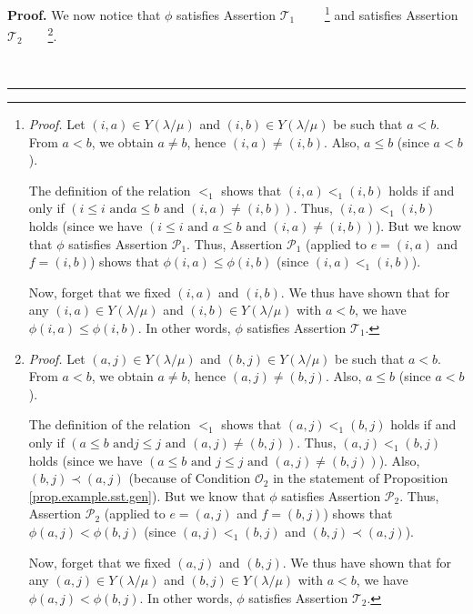 \documentclass[numbers=enddot,12pt,final,onecolumn,notitlepage,abstracton]{scrartcl}
\theoremstyle{definition}
\newenvironment{proof}[1][Proof]{\noindent\textbf{#1.} }{\ \rule{0.5em}{0.5em}}
\newenvironment{verlong}{}{}
\begin{document}
\begin{verlong}
\begin{footnotesize}
\begin{proof}
We now notice that $\phi$ satisfies Assertion $\mathcal{T}_{1}$%
\ \ \ \ \footnote{\textit{Proof.} Let $\left(  i,a\right)  \in Y\left(
\lambda/\mu\right)  $ and $\left(  i,b\right)  \in Y\left(  \lambda
/\mu\right)  $ be such that $a<b$. From $a<b$, we obtain $a\neq b$, hence
$\left(  i,a\right)  \neq\left(  i,b\right)  $. Also, $a \leq b$ (since $a <
b$).
\par
The definition of the relation $<_{1}$ shows that $\left(  i,a\right)
<_{1}\left(  i,b\right)  $ holds if and only if $\left(  i\leq i\text{ and
}a\leq b\text{ and }\left(  i,a\right)  \neq\left(  i,b\right)  \right)  $.
Thus, $\left(  i,a\right)  <_{1}\left(  i,b\right)  $ holds (since we have
$\left(  i\leq i\text{ and }a\leq b\text{ and }\left(  i,a\right)  \neq\left(
i,b\right)  \right)  $). But we know that $\phi$ satisfies Assertion
$\mathcal{P}_{1}$. Thus, Assertion $\mathcal{P}_{1}$ (applied to $e=\left(
i,a\right)  $ and $f=\left(  i,b\right)  $) shows that $\phi\left(
i,a\right)  \leq\phi\left(  i,b\right)  $ (since $\left(  i,a\right)
<_{1}\left(  i,b\right)  $).
\par
Now, forget that we fixed $\left(  i,a\right)  $ and $\left(  i,b\right)  $.
We thus have shown that for any $\left(  i,a\right)  \in Y\left(  \lambda
/\mu\right)  $ and $\left(  i,b\right)  \in Y\left(  \lambda/\mu\right)  $
with $a<b$, we have $\phi\left(  i,a\right)  \leq\phi\left(  i,b\right)  $. In
other words, $\phi$ satisfies Assertion $\mathcal{T}_{1}$.} and satisfies
Assertion $\mathcal{T}_{2}$\ \ \ \ \footnote{\textit{Proof.} Let $\left(
a,j\right)  \in Y\left(  \lambda/\mu\right)  $ and $\left(  b,j\right)  \in
Y\left(  \lambda/\mu\right)  $ be such that $a<b$. From $a<b$, we obtain
$a\neq b$, hence $\left(  a,j\right)  \neq\left(  b,j\right)  $. Also, $a \leq
b$ (since $a < b$).
\par
The definition of the relation $<_{1}$ shows that $\left(  a,j\right)
<_{1}\left(  b,j\right)  $ holds if and only if $\left(  a\leq b\text{ and
}j\leq j\text{ and }\left(  a,j\right)  \neq\left(  b,j\right)  \right)  $.
Thus, $\left(  a,j\right)  <_{1}\left(  b,j\right)  $ holds (since we have
$\left(  a\leq b\text{ and }j\leq j\text{ and }\left(  a,j\right)  \neq\left(
b,j\right)  \right)  $). Also, $\left(  b,j\right)  \prec\left(  a,j\right)  $
(because of Condition $\mathcal{O}_{2}$ in the statement of Proposition
\ref{prop.example.sst.gen}). But we know that $\phi$ satisfies Assertion
$\mathcal{P}_{2}$. Thus, Assertion $\mathcal{P}_{2}$ (applied to $e=\left(
a,j\right)  $ and $f=\left(  b,j\right)  $) shows that $\phi\left(
a,j\right)  <\phi\left(  b,j\right)  $ (since $\left(  a,j\right)
<_{1}\left(  b,j\right)  $ and $\left(  b,j\right)  \prec\left(  a,j\right)
$).
\par
Now, forget that we fixed $\left(  a,j\right)  $ and $\left(  b,j\right)  $.
We thus have shown that for any $\left(  a,j\right)  \in Y\left(  \lambda
/\mu\right)  $ and $\left(  b,j\right)  \in Y\left(  \lambda/\mu\right)  $
with $a<b$, we have $\phi\left(  a,j\right)  <\phi\left(  b,j\right)  $. In
other words, $\phi$ satisfies Assertion $\mathcal{T}_{2}$.}.


\end{proof}
\end{footnotesize}
\end{verlong}
\end{document}
